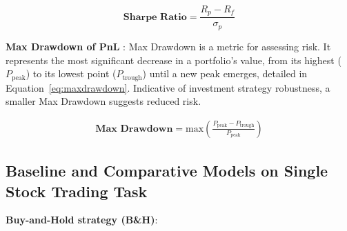   \begin{equation}
    \textbf{Sharpe Ratio} = \frac{R_p - R_f}{\sigma_p}
    \label{eq:sharpe}
  \end{equation}  


  
\textbf{Max Drawdown of PnL} \cite{ang2003downside}: Max Drawdown is a metric for assessing risk. It represents the most significant decrease in a portfolio's value, from its highest ($P_{\text{peak}}$) to its lowest point ($P_{\text{trough}}$) until a new peak emerges, detailed in Equation~\ref{eq:maxdrawdown}. Indicative of investment strategy robustness, a smaller Max Drawdown suggests reduced risk.
  
    \begin{align}
    \label{eq:maxdrawdown}
    \textbf{Max Drawdown} = \text{max}(\frac{P_{\text{peak}} - P_{\text{trough}}}{P_{\text{peak}}})
    \end{align}



\subsection{Baseline and Comparative Models on Single Stock Trading Task}
\label{appendix:model_set}


\textbf{Buy-and-Hold strategy (B\&H)}: 

